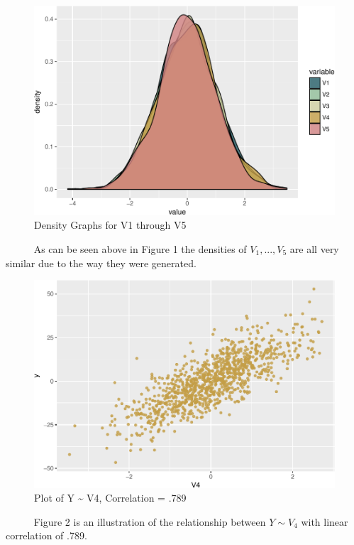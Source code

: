 \documentclass[12pt,twoside]{reedthesis}
\begin{document}
  \begin{figure}[htbp]
  \centering
  \includegraphics{Thesis_files/figure-latex/denv1v5-1.pdf}
  \caption{\label{fig:denv1v5}Density Graphs for V1 through V5}
  \end{figure}
  
  ~~~~~ As can be seen above in Figure 1 the densities of \(V_1,...,V_5\)
  are all very similar due to the way they were generated.
  
  \begin{figure}[htbp]
  \centering
  \includegraphics{Thesis_files/figure-latex/yv4-1.pdf}
  \caption{\label{fig:yv4}Plot of Y \textasciitilde{} V4, Correlation = .789}
  \end{figure}
  
  ~~~~~ Figure 2 is an illustration of the relationship between
  \(Y\sim V_4\) with linear correlation of .789.
  
\end{document}
